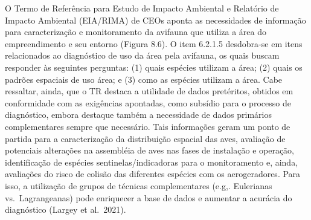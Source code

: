 \documentclass[
  oneside]{scrbook}
\begin{document}
O Termo de Referência para Estudo de Impacto Ambiental e Relatório de Impacto Ambiental (EIA/RIMA) de CEOs aponta as necessidades de informação para caracterização e monitoramento da avifauna que utiliza a área do empreendimento e seu entorno (Figura 8.6). O item 6.2.1.5 desdobra-se em itens relacionados ao diagnóstico de uso da área pela avifauna, os quais buscam responder às seguintes perguntas: (1) quais espécies utilizam a área; (2) quais os padrões espaciais de uso área; e (3) como as espécies utilizam a área. Cabe ressaltar, ainda, que o TR destaca a utilidade de dados pretéritos, obtidos em conformidade com as exigências apontadas, como subsídio para o processo de diagnóstico, embora destaque também a necessidade de dados primários complementares sempre que necessário. Tais informações geram um ponto de partida para a caracterização da distribuição espacial das aves, avaliação de potenciais alterações na assembléia de aves nas fases de instalação e operação, identificação de espécies sentinelas/indicadoras para o monitoramento e, ainda, avaliações do risco de colisão das diferentes espécies com os aerogeradores. Para isso, a utilização de grupos de técnicas complementares (e.g,. Eulerianas vs.~Lagrangeanas) pode enriquecer a base de dados e aumentar a acurácia do diagnóstico (Largey et al.~2021).
\end{document}
